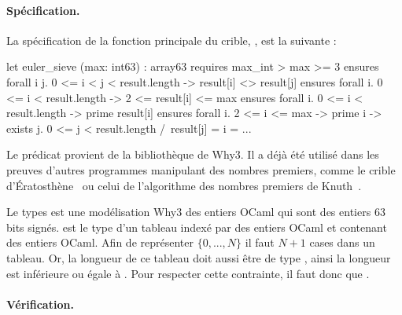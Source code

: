 \documentclass[a4paper]{easychair}
\begin{document}
\paragraph{Spécification.}
La spécification de la fonction principale du crible,
, est la suivante :

\begin{why3}
let euler_sieve (max: int63) : array63
  requires { max_int > max >= 3 }
  ensures  { forall i j. 0 <= i < j < result.length -> result[i] <> result[j] }
  ensures  { forall i. 0 <= i < result.length -> 2 <= result[i] <= max }
  ensures  { forall i. 0 <= i < result.length -> prime result[i] }
  ensures  { forall i. 2 <= i <= max -> prime i ->
                       exists j. 0 <= j < result.length /\ result[j] = i }
= ...
\end{why3}


Le prédicat  provient de la bibliothèque 
de Why3. Il a déjà été utilisé dans les preuves d'autres programmes
manipulant des nombres premiers, comme le crible
d'Ératosthène~\cite{sieve-eratosthene-why3} ou celui de l'algorithme
des nombres premiers de Knuth~\cite{knuth-prime-numbers,knuth-prime-numbers-why3}.


Le types  est une modélisation Why3 des entiers OCaml qui sont
des entiers 63 bits signés.  est le type d'un tableau indexé
par des entiers OCaml et contenant des entiers OCaml.
Afin de représenter $\{0,...,N\}$ il faut $N + 1$ cases dans un tableau.
Or, la longueur de ce tableau doit aussi être de type , ainsi
la longueur est inférieure ou égale à . Pour respecter
cette contrainte, il faut donc que .


\paragraph{Vérification.}
\end{document}
